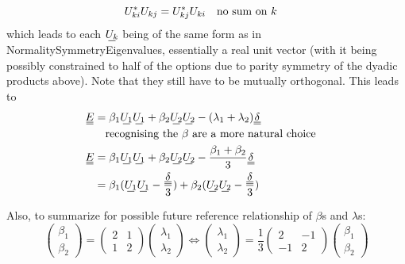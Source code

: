 \documentclass[11pt]{article}
\begin{document}
\begin{equation}
    U_{ki}^*U_{kj} = U_{kj}^*U_{ki} \qq{no sum on $k$}
\end{equation}
which leads to each $\su{U_k}$ being of the same form as in NormalitySymmetryEigenvalues, essentially a real unit vector (with it being possibly constrained to half of the options due to parity symmetry of the dyadic products above).
Note that they still have to be mutually orthogonal.
This leads to
\begin{align}
    \du{E} &= \beta_1 \su{U_1}\su{U_1} + \beta_2 \su{U_2}\su{U_2} - (\lambda_1+\lambda_2)\du{\delta} \\
    &\qq{recognising the $\beta$ are a more natural choice} \\
    \du{E} &= \beta_1 \su{U_1}\su{U_1} + \beta_2 \su{U_2}\su{U_2} - \frac{\beta_1 + \beta_2}{3}\du{\delta} \\
    &= \beta_1 (\su{U_1}\su{U_1} - \frac{\du{\delta}}{3}) + \beta_2 (\su{U_2}\su{U_2} - \frac{\du{\delta}}{3})
\end{align}

Also, to summarize for possible future reference relationship of $\beta$s and $\lambda$s:
\begin{equation}
    \begin{pmatrix} \beta_1 \\ \beta_2 \end{pmatrix} = \begin{pmatrix} 2 & 1 \\ 1 & 2 \end{pmatrix} \begin{pmatrix} \lambda_1 \\ \lambda_2 \end{pmatrix} \Leftrightarrow \begin{pmatrix} \lambda_1 \\ \lambda_2 \end{pmatrix} = \frac{1}{3}\begin{pmatrix} 2 & -1 \\ -1 & 2 \end{pmatrix} \begin{pmatrix} \beta_1 \\ \beta_2 \end{pmatrix}
\end{equation}

\pagebreak
{}
\end{document}

